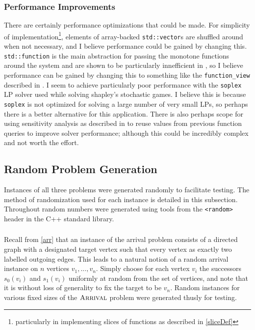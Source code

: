 \subsubsection{Performance Improvements}
There are certainly performance optimizations that could be made. For simplicity of implementation\footnote{particularly
in implementing slices of functions as described in \cref{sliceDef}},
elements of array-backed \lstinline{std::vector}s are shuffled around when not necessary, and I believe
performance could be gained by changing this. \lstinline{std::function} is the main abstraction for passing
the monotone functions around the system and are shown to be particularly innefficient in \citep{stdFunctionBad},
so I believe performance can be gained by changing this to something like the \lstinline{function_view} described in \citep{stdFunctionBad}.
I seem to achieve particularly poor performance with the \lstinline{soplex} LP solver used while solving shapley's stochastic games.
I believe this is because \lstinline{soplex} is not optimized for solving a large number of very small LPs,
so perhaps there is a better alternative for this application. There is also perhaps scope for using sensitivity
analysis as described in \citep{sensAnalysis} to reuse values from previous function queries to improve
solver performance; although this could be incredibly complex and not worth the effort.

\subsection{Random Problem Generation}
Instances of all three problems were generated randomly to facilitate testing. The method of randomization used
for each instance is detailed in this subsection. Throughout random numbers were generated using tools
from the \lstinline{<random>} header in the C++ standard library.

\subsubsection{\arr}
Recall from \cref{arr} that an instance of the arrival problem consists of a directed graph with
a designated target vertex such that every vertex as exactly two labelled outgoing edges.
This leads to a natural notion of a random arrival instance on $n$ vertices $v_1, ..., v_n$.
Simply choose for each vertex $v_i$ the successors $s_0(v_i)$ and $s_1(v_i)$ uniformly at random
from the set of vertices, and note that it is without loss of generality to fix the target to be $v_n$.
Random instances for various fixed sizes of the $\textsc{Arrival}$ problem were generated thusly for testing.

